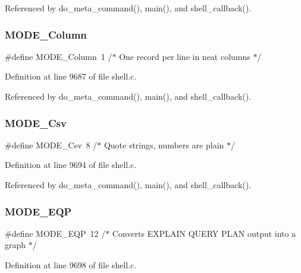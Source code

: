 Referenced by do\+\_\+meta\+\_\+command(), main(), and shell\+\_\+callback().

\mbox{\label{shell_8c_aa4deb50ceb88ff6c8e442a2cf5b6ea9f}} 
\subsubsection{M\+O\+D\+E\+\_\+\+Column}
{\footnotesize\ttfamily \#define M\+O\+D\+E\+\_\+\+Column~1  /$\ast$ One record per line in neat columns $\ast$/}



Definition at line 9687 of file shell.\+c.



Referenced by do\+\_\+meta\+\_\+command(), main(), and shell\+\_\+callback().

\mbox{\label{shell_8c_aabd0c82a272b1102d6166fffcd3e47ed}} 
\subsubsection{M\+O\+D\+E\+\_\+\+Csv}
{\footnotesize\ttfamily \#define M\+O\+D\+E\+\_\+\+Csv~8  /$\ast$ Quote strings, numbers are plain $\ast$/}



Definition at line 9694 of file shell.\+c.



Referenced by do\+\_\+meta\+\_\+command(), main(), and shell\+\_\+callback().

\mbox{\label{shell_8c_a345bcd06659ab17e7ea6e3fbe2958871}} 
\subsubsection{M\+O\+D\+E\+\_\+\+E\+QP}
{\footnotesize\ttfamily \#define M\+O\+D\+E\+\_\+\+E\+QP~12  /$\ast$ Converts E\+X\+P\+L\+A\+IN Q\+U\+E\+RY P\+L\+AN output into a graph $\ast$/}



Definition at line 9698 of file shell.\+c.



